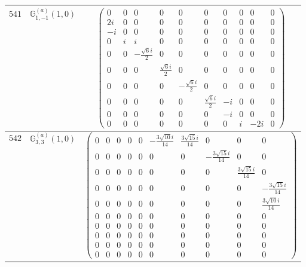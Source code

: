 \documentclass[fleqn,8pt,landscape]{jsarticle}
\begin{document}
\begin{center}
\begin{longtable}{ccc}
$ 541 $ & $ \mathbb{G}_{1,-1}^{(a)}(1,0) $ & $ \begin{pmatrix} 0 & 0 & 0 & 0 & 0 & 0 & 0 & 0 & 0 & 0 \\ 2 i & 0 & 0 & 0 & 0 & 0 & 0 & 0 & 0 & 0 \\ - i & 0 & 0 & 0 & 0 & 0 & 0 & 0 & 0 & 0 \\ 0 & i & i & 0 & 0 & 0 & 0 & 0 & 0 & 0 \\ 0 & 0 & - \frac{\sqrt{6} i}{2} & 0 & 0 & 0 & 0 & 0 & 0 & 0 \\ 0 & 0 & 0 & \frac{\sqrt{6} i}{2} & 0 & 0 & 0 & 0 & 0 & 0 \\ 0 & 0 & 0 & 0 & - \frac{\sqrt{6} i}{2} & 0 & 0 & 0 & 0 & 0 \\ 0 & 0 & 0 & 0 & 0 & \frac{\sqrt{6} i}{2} & - i & 0 & 0 & 0 \\ 0 & 0 & 0 & 0 & 0 & 0 & - i & 0 & 0 & 0 \\ 0 & 0 & 0 & 0 & 0 & 0 & 0 & i & - 2 i & 0 \end{pmatrix} $ \\ \hline
$ 542 $ & $ \mathbb{G}_{3,3}^{(a)}(1,0) $ & $ \begin{pmatrix} 0 & 0 & 0 & 0 & 0 & - \frac{3 \sqrt{10} i}{14} & \frac{3 \sqrt{15} i}{14} & 0 & 0 & 0 \\ 0 & 0 & 0 & 0 & 0 & 0 & 0 & - \frac{3 \sqrt{15} i}{14} & 0 & 0 \\ 0 & 0 & 0 & 0 & 0 & 0 & 0 & 0 & \frac{3 \sqrt{15} i}{14} & 0 \\ 0 & 0 & 0 & 0 & 0 & 0 & 0 & 0 & 0 & - \frac{3 \sqrt{15} i}{14} \\ 0 & 0 & 0 & 0 & 0 & 0 & 0 & 0 & 0 & \frac{3 \sqrt{10} i}{14} \\ 0 & 0 & 0 & 0 & 0 & 0 & 0 & 0 & 0 & 0 \\ 0 & 0 & 0 & 0 & 0 & 0 & 0 & 0 & 0 & 0 \\ 0 & 0 & 0 & 0 & 0 & 0 & 0 & 0 & 0 & 0 \\ 0 & 0 & 0 & 0 & 0 & 0 & 0 & 0 & 0 & 0 \\ 0 & 0 & 0 & 0 & 0 & 0 & 0 & 0 & 0 & 0 \end{pmatrix} $ \\ \hline

\end{longtable}
\end{center}
\end{document}
